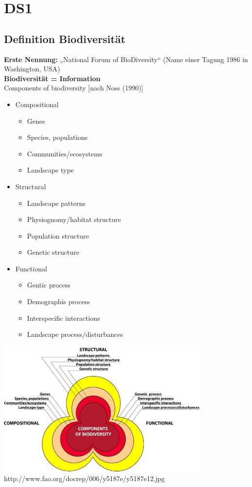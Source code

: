 \section{DS1}
\subsection{Definition Biodiversität}
\textbf{Erste Nennung:} „National Forum of BioDiversity“ (Name einer Tagung 1986 in Washington, USA)\\
\textbf{Biodiversität = Information}\\
Components of biodiversity [nach Noss (1990)]
\begin{itemize}
	\item Compositional
	\begin{itemize}
		\item Genes
		\item Species, populations
		\item Communities/ecosystems
		\item Landscape type
	\end{itemize}
	\item Structural
	\begin{itemize}
		\item Landscape patterns
		\item Physiognomy/habitat structure
		\item Population structure
		\item Genetic structure
	\end{itemize}
	\item Functional
	\begin{itemize}
		\item Gentic process
		\item Demographis process
		\item Interspecific interactions
		\item Landscape process/disturbances
	\end{itemize}
\end{itemize}

\includegraphics[width=0.8\textwidth]{lectures/DS1/pix/y5187e12.jpg}\\
http://www.fao.org/docrep/006/y5187e/y5187e12.jpg